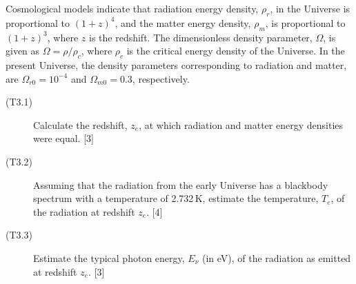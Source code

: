 Cosmological models indicate that radiation energy density, $\rho_r$, in the
Universe is proportional to $(1+z)^4$, and the matter energy density,
$\rho_m$, is proportional to $(1+z)^3$, where $z$ is the redshift. The
dimensionless density parameter, $\Omega$, is given as $\Omega = \rho/\rho_c$,
where $\rho_c$ is the critical energy density of the Universe. In the present
Universe, the density parameters corresponding to radiation and matter, are
$\Omega_{r0} = 10^{-4}$ and $\Omega_{m0} = 0.3$, respectively.

\begin{description}
\item[(T3.1)] Calculate the redshift, $z_e$, at which radiation and matter
  energy densities were equal. \hfill[3]
\item[(T3.2)] Assuming that the radiation from the early Universe has a
  blackbody spectrum with a temperature of 2.732\,K, estimate the
  temperature, $T_e$, of the radiation at redshift $z_e$. \hfill[4]
\item[(T3.3)] Estimate the typical photon energy, $E_\nu$ (in eV), of the
  radiation as emitted at redshift $z_e$. \hfill[3]
\end{description}

